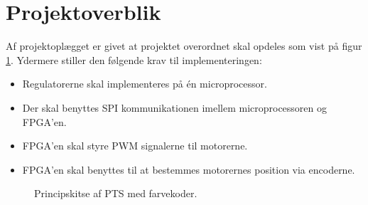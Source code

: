 \section{Projektoverblik}
\label{sec:projektoverblik}

Af projektoplægget er givet at projektet overordnet skal opdeles som vist på 
figur \ref{sec:projektoverblik}. 
Ydermere stiller den følgende krav til implementeringen:
\begin{itemize}
  \item Regulatorerne skal implementeres på én microprocessor.
  \item Der skal benyttes SPI kommunikationen imellem microprocessoren og FPGA’en.
  \item FPGA’en skal styre PWM signalerne til motorerne.
  \item FPGA’en skal benyttes til at bestemmes motorernes position via encoderne.
\end{itemize}

\bigskip

\begin{figure}[!th]
\centering
\begin{tikzpicture}[auto, node distance=1cm,>=latex']

\end{tikzpicture}
\caption[Principskitse af PTS]{Principskitse af PTS med farvekoder.}
\label{fig:overview_openloop_PTS}
\end{figure}

